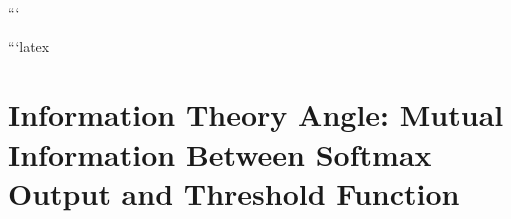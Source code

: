 \documentclass[11pt]{article}
\theoremstyle{definition}
\begin{document}
















































```

































```latex






\section{Information Theory Angle: Mutual Information Between Softmax Output and Threshold Function}
\end{document}
